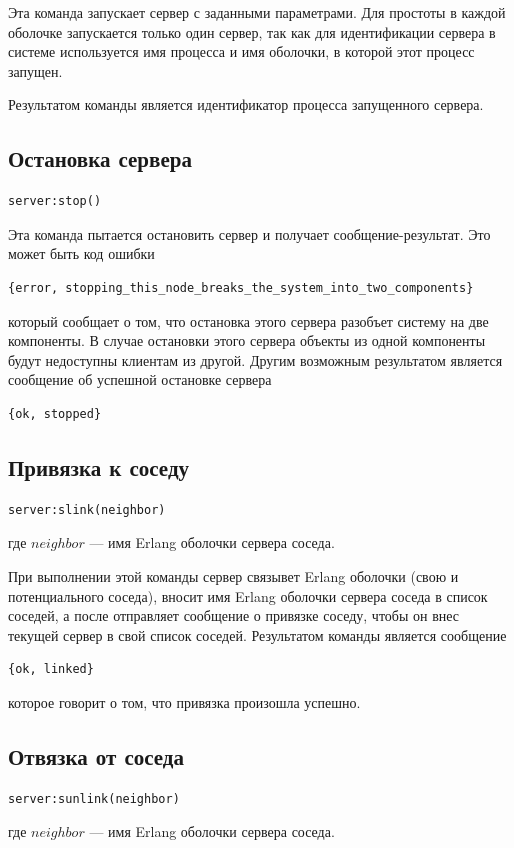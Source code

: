 			Эта команда запускает сервер с заданными параметрами. Для простоты в каждой оболочке запускается только один сервер, так как
			для идентификации сервера в системе используется имя процесса и имя оболочки, в которой этот процесс запущен.

			Результатом команды является идентификатор процесса запущенного сервера.

		\subsection{Остановка сервера}
			\begin{lstlisting}
server:stop()
			\end{lstlisting}
			Эта команда пытается остановить сервер и получает сообщение-результат. Это может быть код ошибки
			\begin{lstlisting}
{error, stopping_this_node_breaks_the_system_into_two_components}
			\end{lstlisting}
			который сообщает о том, что остановка этого сервера разобъет систему на две компоненты. В случае остановки этого сервера
			объекты из одной компоненты будут недоступны клиентам из другой. Другим возможным результатом является сообщение об успешной
			остановке сервера
			\begin{lstlisting}
{ok, stopped}
			\end{lstlisting}

		\subsection{Привязка к соседу}
			\begin{lstlisting}
server:slink(neighbor)
			\end{lstlisting}
			где $neighbor$ --- имя Erlang оболочки сервера соседа.

			При выполнении этой команды сервер связывет Erlang оболочки (свою и потенциального соседа), вносит имя Erlang оболочки сервера соседа 
			в список соседей, а после отправляет сообщение о привязке соседу, чтобы он внес текущей сервер в свой список соседей. Результатом команды 
			является сообщение 
			\begin{lstlisting}
{ok, linked}
			\end{lstlisting}
			которое говорит о том, что привязка произошла успешно.

		\subsection{Отвязка от соседа}
			\begin{lstlisting}
server:sunlink(neighbor)
			\end{lstlisting}
			где $neighbor$ --- имя Erlang оболочки сервера соседа.

